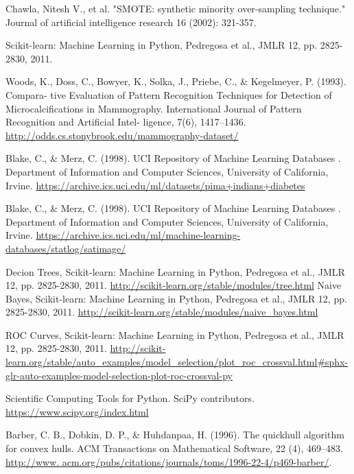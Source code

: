 \documentclass[10pt,journal,compsoc]{IEEEtran}
\begin{document}
\begin{thebibliography}{10}

Chawla, Nitesh V., et al. "SMOTE: synthetic minority over-sampling technique." Journal of artificial intelligence research 16 (2002): 321-357.

Scikit-learn: Machine Learning in Python, Pedregosa et al., JMLR 12, pp. 2825-2830, 2011.

Woods, K., Doss, C., Bowyer, K., Solka, J., Priebe, C., \& Kegelmeyer, P. (1993). Compara- tive Evaluation of Pattern Recognition Techniques for Detection of Microcalcifications in Mammography. International Journal of Pattern Recognition and Artificial Intel- ligence, 7(6), 1417–1436.
\url{http://odds.cs.stonybrook.edu/mammography-dataset/}

Blake, C., \& Merz, C. (1998). UCI Repository of Machine Learning Databases . Department of Information and Computer Sciences, University of California, Irvine.
\url{https://archive.ics.uci.edu/ml/datasets/pima+indians+diabetes}

Blake, C., \& Merz, C. (1998). UCI Repository of Machine Learning Databases . Department of Information and Computer Sciences, University of California, Irvine.
\url{https://archive.ics.uci.edu/ml/machine-learning-databases/statlog/satimage/}

Decion Trees, Scikit-learn: Machine Learning in Python, Pedregosa et al., JMLR 12, pp. 2825-2830, 2011.
\url{http://scikit-learn.org/stable/modules/tree.html}
Naive Bayes, Scikit-learn: Machine Learning in Python, Pedregosa et al., JMLR 12, pp. 2825-2830, 2011.
\url{http://scikit-learn.org/stable/modules/naive_bayes.html}


ROC Curves, Scikit-learn: Machine Learning in Python, Pedregosa et al., JMLR 12, pp. 2825-2830, 2011.
\url{http://scikit-learn.org/stable/auto_examples/model_selection/plot_roc_crossval.html#sphx-glr-auto-examples-model-selection-plot-roc-crossval-py}

Scientific Computing Tools for Python. SciPy contributors.
\url{https://www.scipy.org/index.html}
 
Barber, C. B., Dobkin, D. P., \& Huhdanpaa, H. (1996). The quickhull algorithm for convex hulls. ACM Transactions on Mathematical Software, 22 (4), 469–483. 
\url{http://www. acm.org/pubs/citations/journals/toms/1996-22-4/p469-barber/}.


\end{thebibliography}
\end{document}
